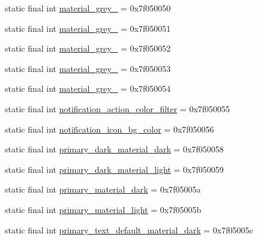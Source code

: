 \begin{DoxyCompactItemize}
\item 
static final int \mbox{\hyperlink{classandroid_1_1support_1_1v7_1_1appcompat_1_1_r_1_1color_a33981738bd67483e3c6c138e47c3083b}{material\+\_\+grey\+\_}} = 0x7f050050
\item 
static final int \mbox{\hyperlink{classandroid_1_1support_1_1v7_1_1appcompat_1_1_r_1_1color_a93899d56d62a17747075b6064ec99364}{material\+\_\+grey\+\_}} = 0x7f050051
\item 
static final int \mbox{\hyperlink{classandroid_1_1support_1_1v7_1_1appcompat_1_1_r_1_1color_a754dcd0cbabaa0fb12f3b774f0394cd6}{material\+\_\+grey\+\_}} = 0x7f050052
\item 
static final int \mbox{\hyperlink{classandroid_1_1support_1_1v7_1_1appcompat_1_1_r_1_1color_a2e6e9968a655a16317a5d332fa831f10}{material\+\_\+grey\+\_}} = 0x7f050053
\item 
static final int \mbox{\hyperlink{classandroid_1_1support_1_1v7_1_1appcompat_1_1_r_1_1color_a6ec6c6585de5abf315a0289cbf5e3584}{material\+\_\+grey\+\_}} = 0x7f050054
\item 
static final int \mbox{\hyperlink{classandroid_1_1support_1_1v7_1_1appcompat_1_1_r_1_1color_a070891da40cfe4de04b6d15085730cf8}{notification\+\_\+action\+\_\+color\+\_\+filter}} = 0x7f050055
\item 
static final int \mbox{\hyperlink{classandroid_1_1support_1_1v7_1_1appcompat_1_1_r_1_1color_acddbdf164e38bf0f0635cda7060f6e53}{notification\+\_\+icon\+\_\+bg\+\_\+color}} = 0x7f050056
\item 
static final int \mbox{\hyperlink{classandroid_1_1support_1_1v7_1_1appcompat_1_1_r_1_1color_a6f3197ffaef2c0dc4af0f27aa444a0e3}{primary\+\_\+dark\+\_\+material\+\_\+dark}} = 0x7f050058
\item 
static final int \mbox{\hyperlink{classandroid_1_1support_1_1v7_1_1appcompat_1_1_r_1_1color_abc7e36eaa8300f0592fdf83fd2cdb2bd}{primary\+\_\+dark\+\_\+material\+\_\+light}} = 0x7f050059
\item 
static final int \mbox{\hyperlink{classandroid_1_1support_1_1v7_1_1appcompat_1_1_r_1_1color_a56f0defd568d11f4259dceccf4848b29}{primary\+\_\+material\+\_\+dark}} = 0x7f05005a
\item 
static final int \mbox{\hyperlink{classandroid_1_1support_1_1v7_1_1appcompat_1_1_r_1_1color_ad93abfea5fcbd22376aeea41048ee7c5}{primary\+\_\+material\+\_\+light}} = 0x7f05005b
\item 
static final int \mbox{\hyperlink{classandroid_1_1support_1_1v7_1_1appcompat_1_1_r_1_1color_add4e227c0820079bd8c7277ed459e013}{primary\+\_\+text\+\_\+default\+\_\+material\+\_\+dark}} = 0x7f05005c

\end{DoxyCompactItemize}
